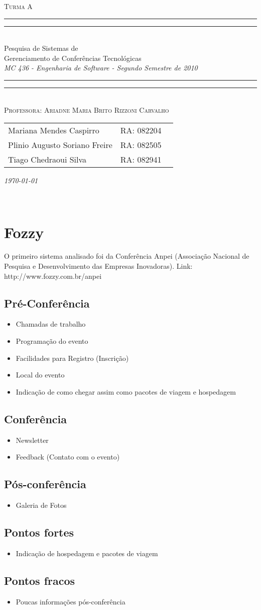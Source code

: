 \documentclass[letter]{article}
\newcommand*{\titleTMB}{\begingroup \centering \settowidth{\unitlength}{\LARGE MC 613} \vspace*{\baselineskip} {\large\scshape  Turma A}\\[\baselineskip] \rule{11.0cm}{1.6pt}\vspace*{-\baselineskip}\vspace*{2pt} \rule{11.0cm}{0.4pt}\\[\baselineskip] {\LARGE  Pesquisa de Sistemas de  }\\[0.2\baselineskip] {\LARGE  Gerenciamento de Conferências Tecnológicas }\\[0.2\baselineskip] {\itshape MC 436 - Engenharia de Software - Segundo Semestre de 2010}\\[0.2\baselineskip] \rule{11.0cm}{0.4pt}\vspace*{-\baselineskip}\vspace{3.2pt} \rule{11.0cm}{1.6pt}\\[\baselineskip] {\large\scshape Professora: Ariadne Maria Brito Rizzoni Carvalho}\par \vfill {\normalsize   \scshape 
    \begin{center} 
      \begin{tabular}{  l  l  p{5cm} } 
        Mariana Mendes Caspirro & RA: 082204\\
        Plinio Augusto Soriano Freire & RA:  082505\\
        Tiago Chedraoui Silva  & RA: 082941\\
      \end{tabular} \end{center}
    \itshape \today }\\[\baselineskip] \vspace{3.2pt} \endgroup}
\begin{document}
\titleTMB 
\newpage

\section{Fozzy}
O primeiro sistema analisado foi da Conferência Anpei (Associação Nacional de Pesquisa e Desenvolvimento das Empresas Inovadoras). Link: http://www.fozzy.com.br/anpei

\subsection{Pré-Conferência}

\begin{itemize}
\item Chamadas de trabalho
\item Programação do evento
\item Facilidades para Registro (Inscrição)
\item Local do evento
\item Indicação de como chegar assim como pacotes de viagem e hospedagem        \end{itemize}

\subsection{Conferência}
\begin{itemize}
\item Newsletter
\item Feedback (Contato com o evento)
\end{itemize}

\subsection{Pós-conferência}
\begin{itemize}
\item Galeria de Fotos
\end{itemize}


\subsection{Pontos fortes}
\begin{itemize}
\item Indicação de hospedagem e pacotes de viagem
\end{itemize}


\subsection{Pontos fracos}
\begin{itemize}
\item Poucas informações pós-conferência
\end{itemize}
\end{document}
